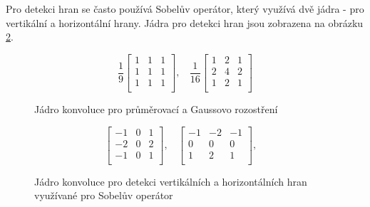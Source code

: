 Pro detekci hran se často používá Sobelův operátor, který využívá dvě jádra -
pro vertikální a horizontální hrany. Jádra pro detekci hran jsou zobrazena na
obrázku \ref{fig:sobel}.

\begin{figure}[]
    \centering
    \begin{equation*}
        {\displaystyle {\frac {1}{9}}{
                \begin{bmatrix}
                    1 & 1 & 1 \\
                    1 & 1 & 1 \\
                    1 & 1 & 1 \\
                \end{bmatrix}},\ \ \ \ }
        {\displaystyle {\frac {1}{16}}{
                \begin{bmatrix}
                    1 & 2 & 1 \\
                    2 & 4 & 2 \\
                    1 & 2 & 1 \\
                \end{bmatrix}}}
    \end{equation*}

    \caption{Jádro konvoluce pro průměrovací a Gaussovo rozostření}
    \label{fig:blur}
\end{figure}
\begin{figure}[]
    \centering
    \begin{equation*}
        {\displaystyle {
                \begin{bmatrix}
                    -1 & 0 & 1 \\
                    -2 & 0 & 2 \\
                    -1 & 0 & 1 \\
                \end{bmatrix}},\ \ \ \ }
        {\displaystyle {
                \begin{bmatrix}
                    -1 & -2 & -1 \\
                    0  & 0  & 0  \\
                    1  & 2  & 1  \\
                \end{bmatrix}},\ \ \ \ }
    \end{equation*}

    \caption{Jádro konvoluce pro detekci vertikálních a horizontálních hran využívané pro Sobelův operátor}
    \label{fig:sobel}
\end{figure}

